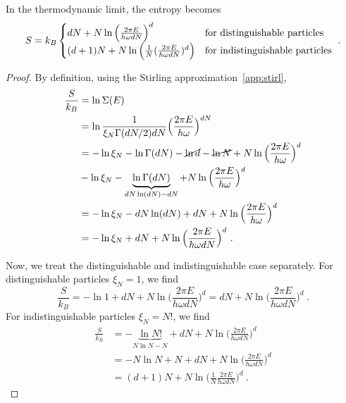     In the thermodynamic limit, the entropy becomes
    \begin{equation*}
        S = k_B \begin{cases}
            d N + N \ln \Big (\frac{2 \pi E }{h \omega d N} \Big)^{d} & \textnormal{for distinguishable particles} \\
            (d+1) N + N \ln \Big ( \frac{1}{N} (\frac{2 \pi E }{h \omega d N} )^d \Big ) & \textnormal{for indistinguishable particles} \\
        \end{cases} ~.
    \end{equation*}
    \begin{proof}
        By definition, using the Stirling approximation~\eqref{app:stirl},
        \begin{equation*}
        \begin{aligned}
            \frac{S}{k_B} & = \ln \Sigma (E) \\ & = \ln \frac{1}{\xi_N \Gamma(dN/2) d N} \Big ( \frac{2 \pi E}{h \omega} \Big)^{dN} \\ & = - \ln \xi_N - \ln \Gamma (dN) - \cancel{\ln d} - \cancel{\ln N} + N \ln \Big (\frac{2 \pi E }{h \omega} \Big )^{d} \\ & - \ln \xi_N - \underbrace{\ln \Gamma (dN)}_{dN \ln (dN) - dN} + N \ln \Big (\frac{2 \pi E }{h \omega} \Big )^{d} \\ & = - \ln \xi_N - dN \ln (dN) + d N + N \ln \Big (\frac{2 \pi E }{h \omega} \Big )^{d} \\ & = - \ln \xi_N + d N + N \ln \Big (\frac{2 \pi E }{h \omega d N} \Big )^{d} ~.
        \end{aligned}
        \end{equation*}

        Now, we treat the distinguishable and indistinguishable case separately. For distinguishable particles $\xi_N = 1$, we find
        \begin{equation*}
            \frac{S}{k_B} = - \ln 1 + d N + N \ln \Big (\frac{2 \pi E }{h \omega d N} \Big )^{d} = d N + N \ln \Big (\frac{2 \pi E }{h \omega d N} \Big )^{d} ~.
        \end{equation*}
        For indistinguishable particles $\xi_N = N!$, we find
        \begin{equation*}
        \begin{aligned}
            \frac{S}{k_B} & = - \underbrace{\ln N!}_{N \ln N - N} + d N + N \ln \Big (\frac{2 \pi E }{h \omega d N} \Big )^{d} \\ & =  - N \ln N + N + d N + N \ln \Big (\frac{2 \pi E }{h \omega d N} \Big )^{d} \\ & = (d+1) N + N \ln \Big ( \frac{1}{N} \frac{2 \pi E }{h \omega d N} \Big )^{d} ~.
        \end{aligned}
        \end{equation*}
    \end{proof}

